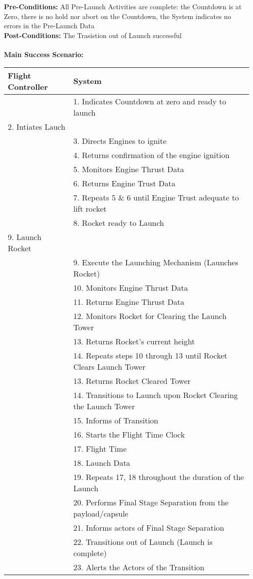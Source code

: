 \documentclass[letterpaper]{article}
\begin{document}
\textbf{Pre-Conditions:  }All Pre-Launch Activities are complete:  the
Countdown is at Zero, there is no hold nor abort on the Countdown, the
System indicates no errors in the Pre-Launch Data\\
\textbf{Post-Conditions:  }The Trasistion out of Launch successful\\\\
\textbf{Main Success Scenario:  }\\
\begin{tabular}{|p{5.75cm}|p{5.75cm}|}\hline
\textbf{Flight Controller} & \textbf{System}\\\hline
&1.  Indicates Countdown at zero and ready to launch\\\hline
2. Intiates Lauch & \\\hline
& 3.  Directs Engines to ignite\\\hline
& 4.  Returns confirmation of the engine ignition\\\hline
& 5.  Monitors Engine Thrust Data\\\hline
& 6.  Returns Engine Trust Data\\\hline
& 7.  Repeats 5 \& 6 until Engine Trust adequate to lift
rocket\\\hline
& 8.  Rocket ready to Launch\\\hline
9. Launch Rocket &\\\hline
& 9.   Execute the Launching Mechanism (Launches Rocket)\\\hline
& 10.  Monitors Engine Thrust Data\\\hline
& 11.  Returns Engine Thrust Data\\\hline
& 12.  Monitors Rocket for Clearing the Launch Tower\\\hline
& 13.  Returns Rocket's current height\\\hline
& 14.  Repeats steps 10 through 13 until Rocket Clears Launch
Tower\\\hline
& 13.  Returns Rocket Cleared Tower\\\hline
& 14.  Transitions to Launch upon Rocket Clearing the Launch
Tower\\\hline
& 15.  Informs of Transition\\\hline 
& 16.  Starts the Flight Time Clock\\\hline
& 17.  Flight Time\\\hline
& 18.  Launch Data\\\hline
& 19.  Repeats 17, 18 throughout the duration of the Launch\\\hline
& 20.  Performs Final Stage Separation from the payload/capsule\\\hline
& 21.  Informs actors of Final Stage Separation\\\hline
& 22. Transitions out of Launch (Launch is complete)\\\hline
& 23. Alerts the Actors of the Transition\\\hline
\end{tabular}\\\\
\end{document}
